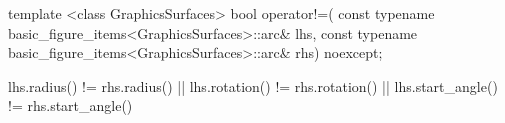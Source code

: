 %
\begin{itemdecl}
template <class GraphicsSurfaces>
bool operator!=(
  const typename basic_figure_items<GraphicsSurfaces>::arc& lhs,
  const typename basic_figure_items<GraphicsSurfaces>::arc& rhs) 
  noexcept;
\end{itemdecl}
\begin{itemdescr}
\pnum
\returns
\begin{codeblock}
lhs.radius() != rhs.radius() || lhs.rotation() != rhs.rotation() ||
lhs.start_angle() != rhs.start_angle()
\end{codeblock}
\end{itemdescr}
